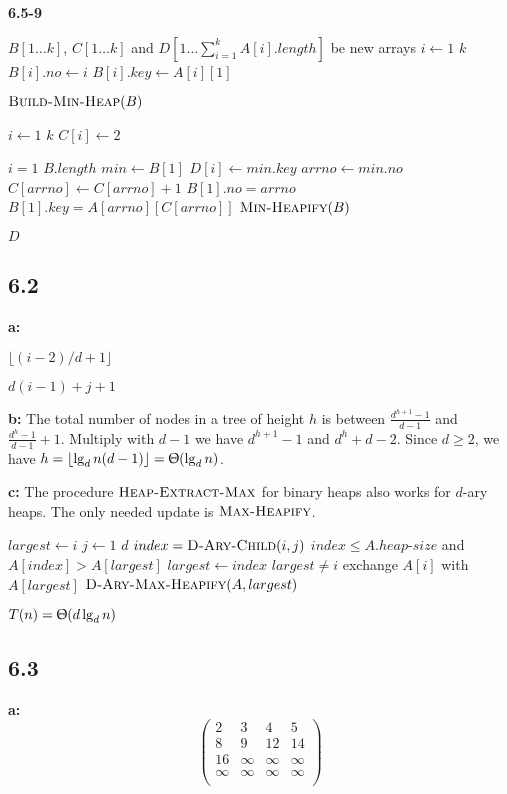 \documentclass{book}
\begin{document}
\begin{CJK}{UTF8}{gkai}
\textbf{6.5-9}
\begin{codebox}
\li $B[1\dots k]$, $C[1\dots k]$ and $D[1\dots \sum_{i=1}^{k}A[i].length]$ be 
new arrays
\li \For $i \gets 1$ \To $k$
\li \Do $B[i].no \gets i$
\li$B[i].key \gets A[i][1]$
\End

\li $\textnormal{\scshape Build-Min-Heap}(B)$

\li \For $i \gets 1$ \To $k$
\li \Do $C[i] \gets 2$
\End

\li \For $i = 1$ \To $B.length$
\li \Do $min \gets B[1]$
\li $D[i] \gets min.key$
\li $arrno \gets min.no$
\li $C[arrno] \gets C[arrno] + 1$
\li $B[1].no = arrno$
\li $B[1].key = A[arrno][C[arrno]]$
\li $\textnormal{\scshape Min-Heapify}(B)$
\End

\li \Return $D$
\end{codebox}

\subsection*{6.2}
\textbf{a:}
\begin{codebox}
\li \Return $\lfloor (i-2)/d + 1\rfloor$
\end{codebox}
\begin{codebox}
\li \Return $d(i-1)+j+1$
\end{codebox}

\textbf{b:} The total number of nodes in a tree of height $h$ is between 
$\frac{d^{h+1}-1}{d-1}$ and $\frac{d^h-1}{d-1}+1$. Multiply with $d-1$ we have 
$d^{h+1}-1$ and $d^h+d-2$. Since $d \ge 2$, we have $h=\lfloor \lg_d n(d-1) 
\rfloor = \Uptheta(\lg_d n)$.

\textbf{c:} The procedure $\textnormal{\scshape Heap-Extract-Max}$ for binary heaps also works 
for $d$-ary heaps. The only needed update is $\textnormal{\scshape Max-Heapify}$.
\begin{codebox}
\li $largest \gets i$
\li \For $j \gets 1$ \To $d$
\li \Do $index = \textnormal{\scshape D-Ary-Child}(i,j)$
\li \If $index \le A.heap\mbox{-}size$ and $A[index] > A[largest]$
\li \Then $largest \gets index$
\End
\End
\li \If $largest \ne i$
\li \Then exchange $A[i]$ with $A[largest]$
\li $\textnormal{\scshape D-Ary-Max-Heapify}(A, largest)$
\End
\end{codebox}
$T(n) = \Uptheta(d\lg_d n)$

\subsection*{6.3}
\textbf{a:}
\begin{equation*}
\left(
\begin{array}{cccc}
2 & 3 & 4 & 5 \\
8 & 9 & 12 & 14 \\
16 & \infty & \infty & \infty \\
\infty & \infty & \infty & \infty \\
\end{array} \right)
\end{equation*}


\end{CJK}
\end{document}

